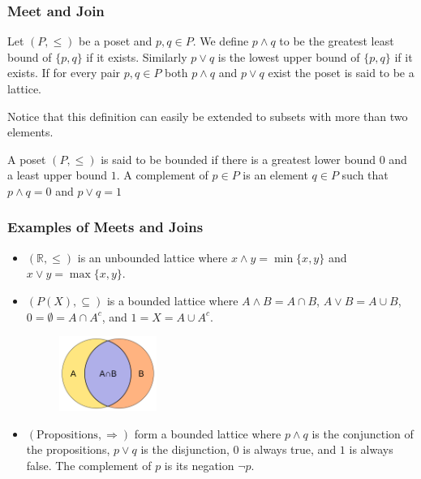 \documentclass{beamer}
\begin{document}
\begin{frame}

	\frametitle{Meet and Join}
	
	\begin{definition}
	
		Let $(P,\leq)$ be a poset and $p,q\in P$. We define $p\wedge q$ to be the greatest least bound of $\{p,q\}$ if it exists. Similarly $p\vee q$ is the lowest upper bound of $\{p,q\}$ if it exists.	If for every pair $p,q\in P$ both $p\wedge q$ and $p\vee q$ exist the poset is said to be a lattice.
	
	\end{definition}

	Notice that this definition can easily be extended to subsets with more than two elements.

	\begin{definition}
		
		A poset $(P,\leq)$ is said to be bounded if there is a greatest lower bound $0$ and a least upper bound $1$. A complement of $p\in P$ is an element $q\in P$ such that $p\wedge q=0$ and $p\vee q=1$		
		
	\end{definition}

\end{frame}

\begin{frame}

	\frametitle{Examples of Meets and Joins}
	
	\begin{example}
	
		\begin{itemize}
		
			\item $(\mathbb{R},\leq)$ is an unbounded lattice where $x\wedge y=\min\{x,y\}$ and $x\vee y=\max\{x,y\}$.
		
			\item $(P(X),\subseteq)$ is a bounded lattice where $A\wedge B=A\cap B$, $A\vee B=A\cup B$, $0=\emptyset=A\cap A^c$, and $1=X=A\cup A^c$.
			
			\begin{figure}
			\includegraphics[width=0.3\textwidth]{intersection_of_sets_A_and_B.png}
			\end{figure}		
			
			\item $(\text{Propositions},\Rightarrow)$ form a bounded lattice where $p\wedge q$ is the conjunction of the propositions, $p\vee q$ is the disjunction, $0$ is always true, and $1$ is always false. The complement of $p$ is its negation $\neg p$.
		
		\end{itemize}			
	
	\end{example}

\end{frame}
\end{document}
